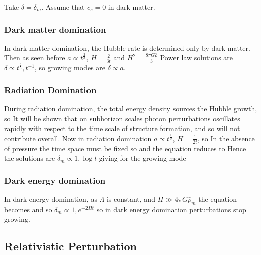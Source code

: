 \documentclass{article}
\begin{document}
\begin{example}
Take $\delta=\delta_m$. Assume that $c_s=0$ in dark matter. 
\subsubsection*{Dark matter domination}
In dark matter domination, the Hubble rate is determined only by dark matter. Then as seen before $a\propto t^{\frac{2}{3}}$,  $H=\frac{2}{3t}$ and $H^2=\frac{8\pi G\bar{\rho}}{3}$
Power law solutions are $\delta \propto t^\frac{2}{3}, t^{-1}$, so growing modes are $\delta \propto a$. 

\subsubsection*{Radiation Domination}
During radiation domination, the total energy density sources the Hubble growth, so 
It will be shown that on subhorizon scales photon perturbations oscillates rapidly with respect to the time scale of structure formation, and so will not contribute overall. Now in radiation domination $a\propto t^\frac{1}{2}$, $H=\frac{1}{2t}$, so 
In the absence of pressure the time space must be fixed so 
and the equation reduces to 
Hence the solutions are $\delta_m \propto 1, \log t$ 
giving for the growing mode 
\subsubsection*{Dark energy domination}
In dark energy domination, as $\Lambda$ is constant, and $H\gg 4\pi G\bar{\rho}_m$ the equation becomes 
and so $\delta_m \propto 1, e^{-2Ht}$ so in dark energy domination perturbations stop growing. 
\end{example}

\subsection{Relativistic Perturbation}
\end{document}

